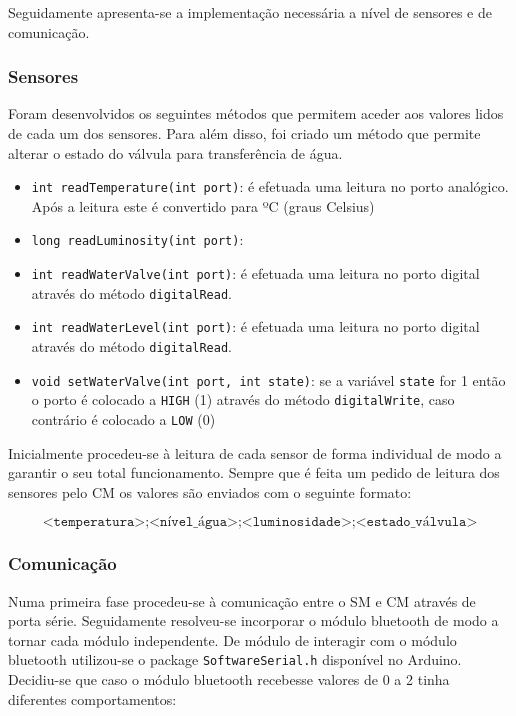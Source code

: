 Seguidamente apresenta-se a implementação necessária a nível de sensores e de comunicação. 

\subsubsection{Sensores}

Foram desenvolvidos os seguintes métodos que permitem aceder aos valores lidos de cada um dos sensores. Para além disso, foi criado um método que permite alterar o estado do válvula para transferência de água. 

\begin{itemize}
	\item \texttt{int readTemperature(int port)}: é efetuada uma leitura no porto analógico. Após a leitura este é convertido para ºC (graus Celsius)
	
	\item \texttt{long readLuminosity(int port)}: 
	
	\item \texttt{int readWaterValve(int port)}: é efetuada uma leitura no porto digital através do método \texttt{digitalRead}. 
	
	\item \texttt{int readWaterLevel(int port)}: é efetuada uma leitura no porto digital através do método \texttt{digitalRead}.
	
	 
	\item \texttt{void setWaterValve(int port, int state)}: se a variável \texttt{state} for 1 então o porto é colocado a \texttt{HIGH} (1) através do método \texttt{digitalWrite}, caso contrário é colocado a \texttt{LOW} (0)
	
\end{itemize}

Inicialmente procedeu-se à leitura de cada sensor de forma individual de modo a garantir o seu total funcionamento. Sempre que é feita um pedido de leitura dos sensores pelo \ac{CM} os valores são enviados com o seguinte formato: 

\begin{equation} 
\label{eq:someequation}
\texttt{<temperatura>;<nível\_água>;<luminosidade>;<estado\_válvula>}
\end{equation}

\subsubsection{Comunicação}


Numa primeira fase procedeu-se à comunicação entre o \ac{SM} e \ac{CM} através de porta série. Seguidamente resolveu-se incorporar o módulo bluetooth de modo a tornar cada módulo independente. De módulo de interagir com o módulo bluetooth utilizou-se o package \texttt{SoftwareSerial.h} disponível no Arduino. Decidiu-se que caso o módulo bluetooth recebesse valores de 0 a 2 tinha diferentes comportamentos: 

